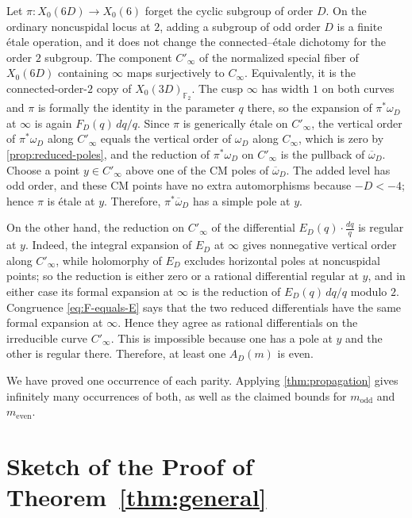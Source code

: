\documentclass[11pt]{amsart}
\theoremstyle{remark}
\numberwithin{equation}{section}
\newcommand{\F}{\mathbb F}
\begin{document}
Let $\pi:X_0(6D)\to X_0(6)$ forget the cyclic subgroup of order $D$.
On the ordinary noncuspidal locus at $2$, adding a subgroup of odd order $D$
is a finite \'etale operation, and it does not change the connected--\'etale
dichotomy for the order $2$ subgroup.  The component $C'_\infty$ of the
normalized special fiber of $X_0(6D)$ containing $\infty$ maps surjectively to
$C_\infty$. Equivalently, it is the connected-order-$2$ copy of
$X_0(3D)_{\F_2}$.  The cusp $\infty$ has width $1$ on both curves and
$\pi$ is formally the identity in the parameter $q$ there, so the expansion
of $\pi^*\omega_D$ at $\infty$ is again $F_D(q)\,dq/q$.  Since $\pi$ is
generically \'etale on $C'_\infty$, the vertical order of $\pi^*\omega_D$
along $C'_\infty$ equals the vertical order of $\omega_D$ along $C_\infty$,
which is zero by \cref{prop:reduced-poles}, and the reduction of
$\pi^*\omega_D$ on $C'_\infty$ is the pullback of $\overline\omega_D$.
Choose a point $y\in C'_\infty$ above one of the CM poles of
$\overline\omega_D$.  The added level has odd order, and these CM points have
no extra automorphisms because $-D<-4$; hence $\pi$ is \'etale at $y$.
Therefore, $\pi^*\overline\omega_D$ has a simple pole at $y$.

On the other hand, the reduction on $C'_\infty$ of the differential
$E_D(q)\cdot \frac{dq}{q}$
is regular at $y$.  Indeed, the integral expansion of $E_D$ at $\infty$
gives nonnegative vertical order along $C'_\infty$, while holomorphy of $E_D$
excludes horizontal poles at noncuspidal points; so the reduction is either
zero or a rational differential regular at $y$, and in either case its formal
expansion at $\infty$ is the reduction of $E_D(q)\,dq/q$ modulo $2$.
Congruence
\eqref{eq:F-equals-E} says that the two reduced differentials have the same
formal expansion at $\infty$.  Hence they agree as rational differentials on
the irreducible curve $C'_\infty$.  This is impossible because one has a pole
at $y$ and the other is regular there.  Therefore, at least one $A_D(m)$ is even.

We have proved one occurrence of each parity.  Applying
\cref{thm:propagation} gives 
 infinitely many occurrences of both, as well as the claimed bounds for
$m_{\mathrm{odd}}$  and $ m_{\mathrm{even}}.$

\section{Sketch of the Proof of Theorem~\ref{thm:general}}\label{sec:general-proof}
\end{document}
